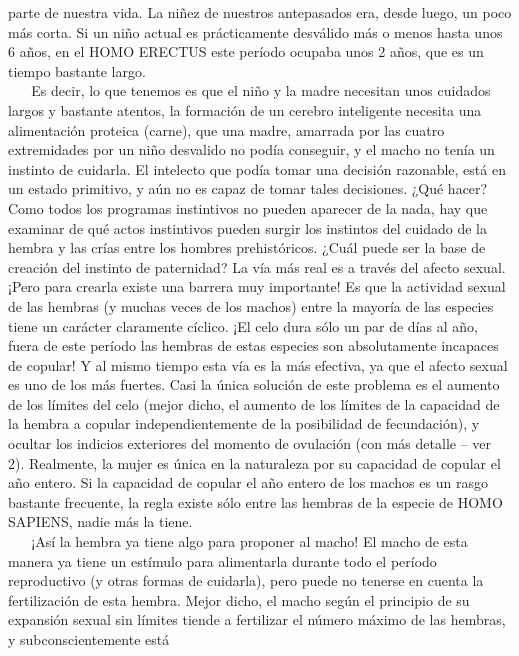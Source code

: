 parte de nuestra vida. La niñez de nuestros antepasados era, desde
luego, un poco más corta. Si un niño actual es prácticamente desválido
más o menos hasta unos 6 años, en el HOMO ERECTUS este período ocupaba
unos 2 años, que es un tiempo bastante largo.\\
\hspace*{0.333em} ~ ~ Es decir, lo que tenemos es que el niño y la madre
necesitan unos cuidados largos y bastante atentos, la formación de un
cerebro inteligente necesita una alimentación proteica (carne), que una
madre, amarrada por las cuatro extremidades por un niño desvalido no
podía conseguir, y el macho no tenía un instinto de cuidarla. El
intelecto que podía tomar una decisión razonable, está en un estado
primitivo, y aún no es capaz de tomar tales decisiones. ¿Qué hacer? Como
todos los programas instintivos no pueden aparecer de la nada, hay que
examinar de qué actos instintivos pueden surgir los instintos del
cuidado de la hembra y las crías entre los hombres prehistóricos. ¿Cuál
puede ser la base de creación del instinto de paternidad? La vía más
real es a través del afecto sexual. ¡Pero para crearla existe una
barrera muy importante! Es que la actividad sexual de las hembras (y
muchas veces de los machos) entre la mayoría de las especies tiene un
carácter claramente cíclico. ¡El celo dura sólo un par de días al año,
fuera de este período las hembras de estas especies son absolutamente
incapaces de copular! Y al mismo tiempo esta vía es la más efectiva, ya
que el afecto sexual es uno de los más fuertes. Casi la única solución
de este problema es el aumento de los límites del celo (mejor dicho, el
aumento de los límites de la capacidad de la hembra a copular
independientemente de la posibilidad de fecundación), y ocultar los
indicios exteriores del momento de ovulación (con más detalle -- ver 2).
Realmente, la mujer es única en la naturaleza por su capacidad de
copular el año entero. Si la capacidad de copular el año entero de los
machos es un rasgo bastante frecuente, la regla existe sólo entre las
hembras de la especie de HOMO SAPIENS, nadie más la tiene.\\
\hspace*{0.333em} ~ ~ ¡Así la hembra ya tiene algo para proponer al
macho! El macho de esta manera ya tiene un estímulo para alimentarla
durante todo el período reproductivo (y otras formas de cuidarla), pero
puede no tenerse en cuenta la fertilización de esta hembra. Mejor dicho,
el macho según el principio de su expansión sexual sin límites tiende a
fertilizar el número máximo de las hembras, y subconscientemente está
